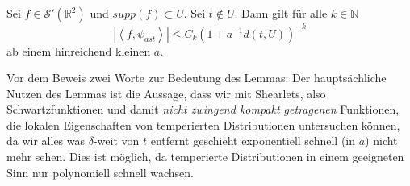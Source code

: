 \begin{lemma}
    \label{lemm:shearlets_decay_quickly_schwartz}
    Sei $f \in \mathcal{S}'(\mathbb{R}^2)$ und $supp(f) \subset U$. Sei $t \notin U$. Dann gilt für alle $k \in \mathbb{N}$
    \begin{equation*}
        |\left\langle f, \psi_{ast}\right\rangle| \leq C_k \left(1+a^{-1} d(t,U)\right)^{-k}
    \end{equation*}
    ab einem hinreichend kleinen $a$.
\end{lemma}

Vor dem Beweis zwei Worte zur Bedeutung des Lemmas: Der hauptsächliche Nutzen des Lemmas ist die Aussage, dass wir mit Shearlets, also Schwartzfunktionen und damit \emph{nicht zwingend kompakt getragenen}  Funktionen, die lokalen Eigenschaften von temperierten Distributionen untersuchen können, da wir alles was $\delta$-weit von $t$ entfernt geschieht exponentiell schnell (in $a$) nicht mehr sehen. Dies ist möglich, da temperierte Distributionen in einem geeigneten Sinn nur polynomiell schnell wachsen.

